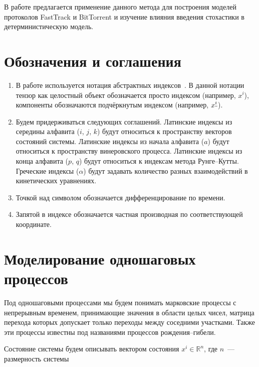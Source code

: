 \documentclass[floatfix,
showkeys,
twocolumn, nofootinbib, superscriptaddress, ]{revtex4-1}
\newcommand{\setR}{\mathbb{R}}
\newcommand{\crd}[1]{\underline{\vphantom{j}{#1}}}
\begin{document}
  В работе предлагается применение данного метода для построения
  моделей протоколов FastTrack и BitTorrent и изучение влияния
  введения стохастики в детерминистическую модель.


\section{Обозначения и соглашения}
\label{sec:2}

  \begin{enumerate}
  \item В работе используется нотация абстрактных
    индексов~\cite{penrose-rindler-1987}. В данной нотации тензор как
    целостный объект обозначается просто индексом (например, $x^{i}$),
    компоненты обозначаются подчёркнутым индексом (например,
    $x^{\crd{i}}$).

  \item Будем придерживаться следующих соглашений. Латинские индексы
    из середины алфавита ($i$, $j$, $k$) будут относиться к
    пространству векторов состояний системы. Латинские индексы из
    начала алфавита ($a$) будут относиться к пространству винеровского
    процесса. Латинские индексы из конца алфавита ($p$, $q$) будут
    относиться к индексам метода Рунге--Кутты. Греческие индексы
    ($\alpha$) будут задавать количество разных взаимодействий в
    кинетических уравнениях.

  \item Точкой над символом обозначается дифференцирование по времени.

  \item Запятой в индексе обозначается частная производная по
    соответствующей координате.

  \end{enumerate}

\section{Моделирование одношаговых процессов}
\label{sec:onestep}

  Под одношаговыми процессами мы будем понимать марковские процессы с
  непрерывным временем, принимающие значения в области целых чисел,
  матрица перехода которых допускает только переходы между соседними
  участками. Также эти процессы известны под названиями процессов
  рождения--гибели.

  Состояние системы будем описывать вектором состояния $x^{i} \in
  \setR^n$, где $n$~--- размерность системы
\end{document}
